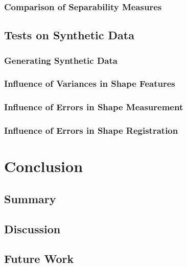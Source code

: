 \documentclass[pdftex,12pt,a4paper]{report}
\begin{document}
\subsection{Comparison of Separability Measures}

\section{Tests on Synthetic Data}

\subsection{Generating Synthetic Data}

\subsection{Influence of Variances in Shape Features}

\subsection{Influence of Errors in Shape Measurement}

\subsection{Influence of Errors in Shape Registration}

\chapter{Conclusion}

\section{Summary}

\section{Discussion}

\section{Future Work}

\listoffigures

\listoftables

\end{document}
